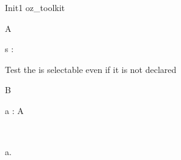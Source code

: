 \begin{zsection}
  \SECTION Init1 \parents oz\_toolkit
\end{zsection}

\begin{class}{A}
 \begin{state}
   s : \nat
 \end{state}
\end{class}

Test the \Init is selectable even if it is not declared

\begin{class}{B}
  \begin{state}
    a : A
  \end{state}\\
  \begin{init}
    a.\Init
  \end{init}
\end{class}
